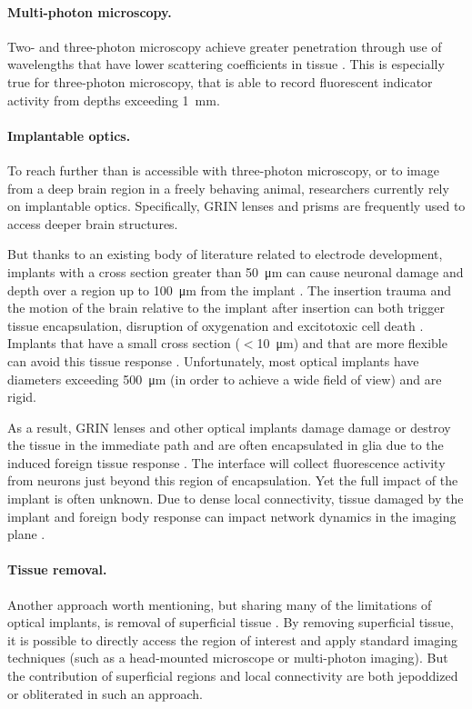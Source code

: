 \paragraph{Multi-photon microscopy.} Two- and three-photon 
microscopy achieve greater penetration through use of 
wavelengths that have lower scattering coefficients in 
tissue \cite{Wang:2017jp}. This is especially true for 
three-photon microscopy, that is able to record 
fluorescent indicator activity from depths exceeding 1~mm.

\paragraph{Implantable optics.} To reach further than 
is accessible with three-photon microscopy, or to image 
from a deep brain region in a freely behaving animal, 
researchers currently rely on implantable optics. 
Specifically, GRIN lenses \cite{Barretto:2009hk} and 
prisms \cite{Andermann:2013kc} are frequently used to 
access deeper brain structures.

But thanks to an existing body of literature related to 
electrode development, implants with a cross section 
greater than 50~\si{\micro\meter} can cause neuronal 
damage and depth over a region up to 100~\si{\micro\meter}
from the implant \cite{Seymour:2007dj}. The insertion 
trauma and the motion of the brain relative to the implant 
after insertion can both trigger tissue encapsulation, 
disruption of oxygenation and  excitotoxic cell death
\cite{Szarowski:2003cz,Polikov:2005cq,McConnell:2009hr,Freire:2011gl}.
Implants that have a small cross section ($<$10~\si{\micro\meter}) 
and that are more flexible can avoid this tissue response 
\cite{JohnPSeymour:2006td,Harris:2011dy,Kozai:2012bp,Patel:2018cr}.
Unfortunately, most optical implants have diameters exceeding 
500~\si{\micro\meter} (in order to achieve a wide field of view) 
and are rigid.

As a result, GRIN lenses and other optical implants damage 
damage or destroy the tissue in the immediate path and 
are often encapsulated in glia due to the induced foreign 
tissue response \cite{Lee:2016ko}. The interface will 
collect fluorescence activity from neurons just beyond this 
region of encapsulation. Yet the full impact of the implant 
is often unknown. Due to dense local connectivity, tissue 
damaged by the implant and foreign body response can impact 
network dynamics in the imaging plane 
\cite{Hayn:2015ew,Hayn:2017kj,GossVarley:2017kf}.

\paragraph{Tissue removal.} Another approach worth mentioning, 
but sharing many of the limitations of optical implants, is 
removal of superficial tissue \cite{Dombeck:2010jr}. By 
removing superficial tissue, it is possible to directly access 
the region of interest and apply standard imaging techniques 
(such as a head-mounted microscope or multi-photon imaging). 
But the contribution of superficial regions and local connectivity 
are both jepoddized or obliterated in such an approach.


